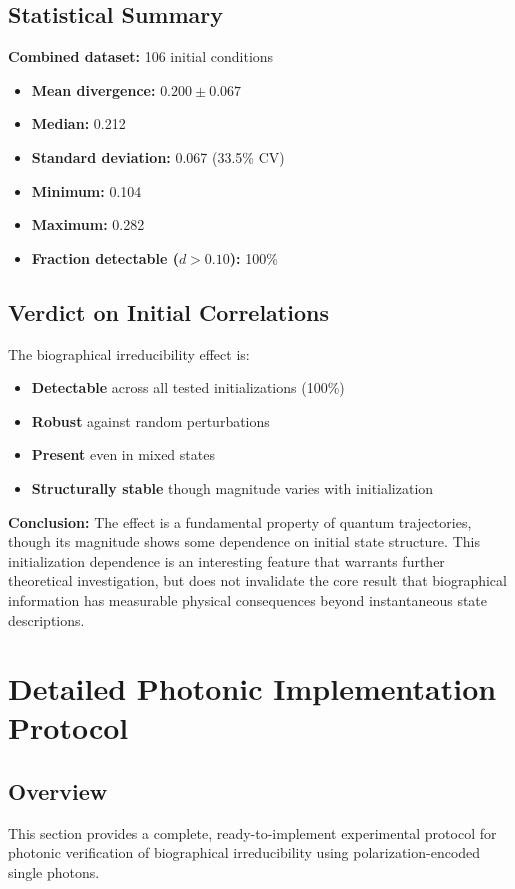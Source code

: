 \documentclass[11pt, onecolumn, letterpaper]{article}
\begin{document}
\subsection{Statistical Summary}
\textbf{Combined dataset:} 106 initial conditions
\begin{itemize}
    \item \textbf{Mean divergence:} $0.200 \pm 0.067$
    \item \textbf{Median:} 0.212
    \item \textbf{Standard deviation:} 0.067 (33.5\% CV)
    \item \textbf{Minimum:} 0.104
    \item \textbf{Maximum:} 0.282
    \item \textbf{Fraction detectable ($d > 0.10$):} 100\%
\end{itemize}

\subsection{Verdict on Initial Correlations}
The biographical irreducibility effect is:
\begin{itemize}
    \item \textbf{Detectable} across all tested initializations (100\%)
    \item \textbf{Robust} against random perturbations
    \item \textbf{Present} even in mixed states
    \item \textbf{Structurally stable} though magnitude varies with initialization
\end{itemize}
\textbf{Conclusion:} The effect is a fundamental property of quantum trajectories, though its magnitude shows some dependence on initial state structure. This initialization dependence is an interesting feature that warrants further theoretical investigation, but does not invalidate the core result that biographical information has measurable physical consequences beyond instantaneous state descriptions.

\section{Detailed Photonic Implementation Protocol}

\subsection{Overview}
This section provides a complete, ready-to-implement experimental protocol for photonic verification of biographical irreducibility using polarization-encoded single photons.
\end{document}
